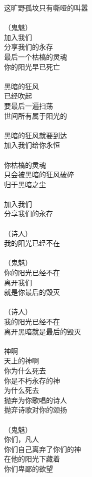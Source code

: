 这旷野孤坟只有嘶哑的叫嚣\\
\\
（鬼魅）\\
加入我们\\
分享我们的永存\\
最后一个枯槁的灵魂\\
你的阳光早已死亡\\
\\
黑暗的狂风\\
已经吹起\\
要最后一遍扫荡\\
世间所有属于阳光的\\
\\
黑暗的狂风就要到达\\
加入我们给你永恒\\
\\
你枯槁的灵魂\\
只会被黑暗的狂风破碎\\
归于黑暗之尘\\
\\
加入我们\\
分享我们的永存\\
\\
（诗人）\\
我的阳光已经不在\\
\\
（鬼魅）\\
你的阳光已经不在\\
离开我们\\
就是你最后的毁灭\\
\\
（诗人）\\
我的阳光已经不在\\
离开黑暗就是最后的毁灭\\
\\
神啊\\
天上的神啊\\
你为什么死去\\
你是不朽永存的神\\
为什么死去\\
抛弃为你歌唱的诗人\\
抛弃诗歌对你的颂扬\\
\\
（鬼魅）\\
你们，凡人\\
你们自己离弃了你们的神\\
在他的阳光下藏着\\
你们卑鄙的欲望\\
\\
